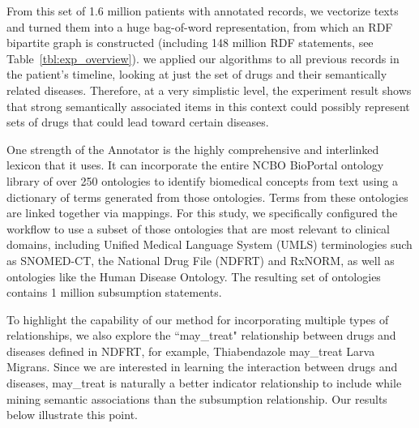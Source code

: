 From this set of 1.6 million patients with annotated records, we vectorize texts and turned them into a huge bag-of-word representation, from which an RDF bipartite graph is constructed (including 148 million RDF statements, see Table~\ref{tbl:exp_overview}). we applied our algorithms to all previous records in the patient's timeline, looking at just the set of drugs and their semantically related diseases.  Therefore, at a very simplistic level, the experiment result shows that strong semantically associated items in this context could possibly represent sets of drugs that could lead toward certain diseases.

One strength of the Annotator is the highly comprehensive and interlinked lexicon that it uses. It can incorporate the entire NCBO BioPortal ontology library of over 250 ontologies to identify biomedical concepts from text using a dictionary of terms generated from those ontologies. Terms from these ontologies are linked together via mappings. For this study, we specifically configured the workflow to use a subset of those ontologies that are most relevant to clinical domains, including Unified Medical Language System (UMLS) terminologies such as SNOMED-CT, the National Drug File (NDFRT) and RxNORM, as well as ontologies like the Human Disease Ontology. The resulting set of ontologies contains 1 million subsumption statements.

To highlight the capability of our method for incorporating multiple types of relationships, we also explore the ``may\_treat" relationship between drugs and diseases defined in NDFRT, for example, Thiabendazole may\_treat Larva Migrans. Since we are interested in learning the interaction between drugs and diseases, may\_treat is naturally a better indicator relationship to include while mining semantic associations than the subsumption relationship. Our results below illustrate this point.


